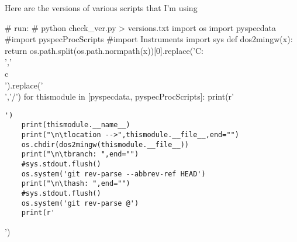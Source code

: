 \documentclass[10pt]{article}
\begin{document}
Here are the versions of various scripts that I'm using
\par
\begin{python}[on]
# run:
# python check_ver.py > versions.txt
import os
import pyspecdata
#import pyspecProcScripts
#import Instruments
import sys
def dos2mingw(x):
    return os.path.split(os.path.normpath(x))[0].replace('C:\\','\\c\\').replace('\\','/')
for thismodule in [pyspecdata, pyspecProcScripts]:
    print(r'\begin{verbatim}')
    print(thismodule.__name__)
    print("\n\tlocation -->",thismodule.__file__,end="")
    os.chdir(dos2mingw(thismodule.__file__))
    print("\n\tbranch: ",end="")
    #sys.stdout.flush()
    os.system('git rev-parse --abbrev-ref HEAD')
    print("\n\thash: ",end="")
    #sys.stdout.flush()
    os.system('git rev-parse @')
    print(r'\end{verbatim}')
\end{python}
\par


\end{document}
